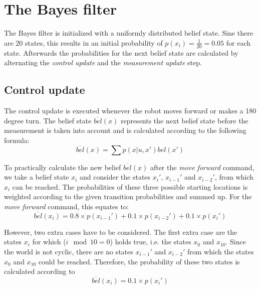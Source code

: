 \documentclass[10pt,a4paper]{article}
\begin{document}
	\section{The Bayes filter}
	The Bayes filter is initialized with a uniformly distributed belief state. Sine there are 20 states, this results in an initial probability of $p(x_i)=\frac{1}{20}=0.05$ for each state. Afterwards the probabilities for the next belief state are calculated by alternating the \textit{control update} and the \textit{measurement update} step.
	
		\subsection{Control update}
		The control update is executed whenever the robot moves forward or makes a 180 degree turn. The belief state $\overline{bel}(x)$ represents the next belief state before the measurement is taken into account and is calculated according to the following formula:
		\begin{displaymath}
			\overline{bel}(x) = \sum p(x|u,x')bel(x')
		\end{displaymath}
		
		To practically calculate the new belief $\overline{bel}(x)$ after the \textit{move forward} command, we take a belief state $x_i$ and consider the states $x_i'$, $x_{i-1}'$ and $x_{i-2}'$, from which $x_i$ can be reached. The probabilities of these three possible starting locations is weighted according to the given transition probabilities and summed up. For the \textit{move forward} command, this equates to:
		\begin{displaymath}
			\overline{bel}(x_i) = 0.8\times p(x_{i-1}') + 0.1\times p(x_{i-2}') + 0.1\times p(x_i')
		\end{displaymath}
		
		However, two extra cases have to be considered. The first extra case are the states $x_i$ for which ($i \mod{10} = 0$) holds true, i.e. the states $x_0$ and $x_{10}$. Since the world is not cyclic, there are no states $x_{i-1}'$ and $x_{i-2}'$ from which the states $x_0$ and $x_{10}$ could be reached. Therefore, the probability of these two states is calculated according to
		\begin{displaymath}
			\overline{bel}(x_i) = 0.1\times p(x_i')
		\end{displaymath}
		
\end{document}
